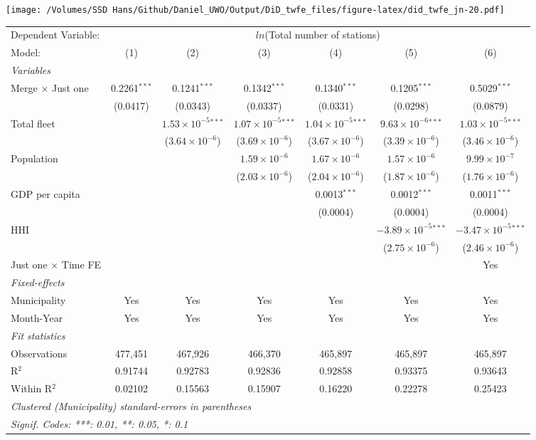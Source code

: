 \documentclass[
]{article}
\begin{document}
\texttt{[image: /Volumes/SSD Hans/Github/Daniel\_UWO/Output/DiD\_twfe\_files/figure-latex/did\_twfe\_jn-20.pdf]}

\begin{tabular}{lcccccc}
\tabularnewline\midrule\midrule
Dependent Variable:&\multicolumn{6}{c}{$ln$(Total number of stations)}\\
Model:&(1) & (2) & (3) & (4) & (5) & (6)\\
\midrule \emph{Variables}&   &   &   &   &   &  \\
Merge $\times $ Just one & 0.2261$^{***}$ & 0.1241$^{***}$ & 0.1342$^{***}$ & 0.1340$^{***}$ & 0.1205$^{***}$ & 0.5029$^{***}$\\
  &(0.0417) & (0.0343) & (0.0337) & (0.0331) & (0.0298) & (0.0879)\\
Total fleet &    & $1.53\times 10^{-5}$$^{***}$ & $1.07\times 10^{-5}$$^{***}$ & $1.04\times 10^{-5}$$^{***}$ & $9.63\times 10^{-6}$$^{***}$ & $1.03\times 10^{-5}$$^{***}$\\
  &   & ($3.64\times 10^{-6}$) & ($3.69\times 10^{-6}$) & ($3.67\times 10^{-6}$) & ($3.39\times 10^{-6}$) & ($3.46\times 10^{-6}$)\\
Population &    &    & $1.59\times 10^{-6}$ & $1.67\times 10^{-6}$ & $1.57\times 10^{-6}$ & $9.99\times 10^{-7}$\\
  &   &    & ($2.03\times 10^{-6}$) & ($2.04\times 10^{-6}$) & ($1.87\times 10^{-6}$) & ($1.76\times 10^{-6}$)\\
GDP per capita &    &    &    & 0.0013$^{***}$ & 0.0012$^{***}$ & 0.0011$^{***}$\\
  &   &    &    & (0.0004) & (0.0004) & (0.0004)\\
HHI &    &    &    &    & $-3.89\times 10^{-5}$$^{***}$ & $-3.47\times 10^{-5}$$^{***}$\\
  &   &    &    &    & ($2.75\times 10^{-6}$) & ($2.46\times 10^{-6}$)\\
Just one $\times$ Time FE &  &  &  &  &  & Yes\\
\midrule \emph{Fixed-effects}&   &   &   &   &   &  \\
Municipality & Yes & Yes & Yes & Yes & Yes & Yes\\
Month-Year & Yes & Yes & Yes & Yes & Yes & Yes\\
\midrule \emph{Fit statistics}&  & & & & & \\
Observations & 477,451&467,926&466,370&465,897&465,897&465,897\\
R$^2$ & 0.91744&0.92783&0.92836&0.92858&0.93375&0.93643\\
Within R$^2$ & 0.02102&0.15563&0.15907&0.16220&0.22278&0.25423\\
\midrule\midrule\multicolumn{7}{l}{\emph{Clustered (Municipality) standard-errors in parentheses}}\\
\multicolumn{7}{l}{\emph{Signif. Codes: ***: 0.01, **: 0.05, *: 0.1}}\\
\end{tabular}
\end{document}
